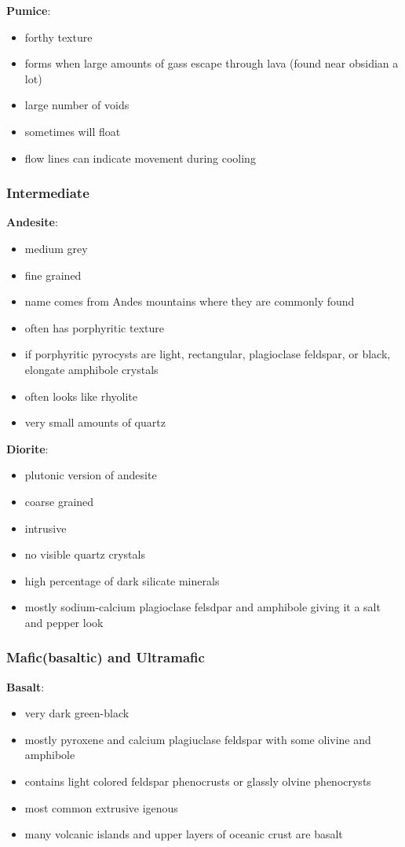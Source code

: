 \documentclass{article}
\begin{document}
\textbf{Pumice}:
\begin{itemize}
    \item forthy texture
    \item forms when large amounts of gass escape through lava (found near obsidian a lot)
    \item large number of voids
    \item sometimes will float
    \item flow lines can indicate movement during cooling
\end{itemize}

\subsubsection*{Intermediate} %
\label{subsub:intermediate}
\textbf{Andesite}:
\begin{itemize}
    \item medium grey
    \item fine grained
    \item name comes from Andes mountains where they are commonly found
    \item often has porphyritic texture
    \item if porphyritic pyrocysts are light, rectangular, plagioclase feldspar, or black, elongate amphibole crystals
    \item often looks like rhyolite
    \item very small amounts of quartz
\end{itemize}

\textbf{Diorite}:
\begin{itemize}
    \item plutonic version of andesite
    \item coarse grained
    \item intrusive
    \item no visible quartz crystals
    \item high percentage of dark silicate minerals
    \item mostly sodium-calcium plagioclase felsdpar and amphibole giving it a salt and pepper look
\end{itemize}



\subsubsection*{Mafic(basaltic) and Ultramafic} %
\label{subsub:mafic_and_ultramafic}
\textbf{Basalt}:
\begin{itemize}
    \item very dark green-black
    \item mostly pyroxene and calcium plagiuclase feldspar with some olivine and amphibole
    \item contains light colored feldspar phenocrusts or glassly olvine phenocrysts
    \item most common extrusive igenous
    \item many volcanic islands and upper layers of oceanic crust are basalt
\end{itemize}
\end{document}
